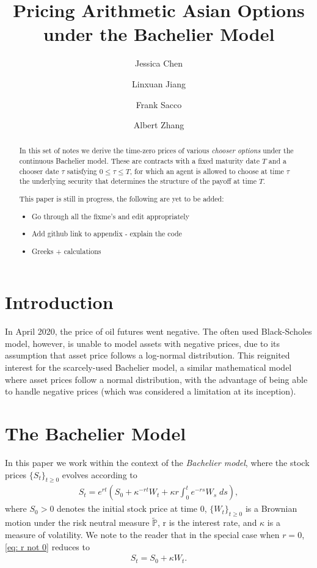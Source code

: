 \documentclass[reqno]{amsart}
\title{Pricing Arithmetic Asian Options under the Bachelier Model} %
\author{Jessica Chen}
\author{Linxuan Jiang}
\author{Frank Sacco}
\author{Albert Zhang}
\begin{document}
\begin{abstract}
     In this set of notes we derive the time-zero prices of various \emph{chooser options} under the continuous Bachelier model.
     These are contracts with a fixed maturity date $T$ and a chooser date $\tau$ satisfying $0 \le \tau \le T$, for which an agent is allowed to choose at time $\tau$ the underlying security that determines the structure of the payoff at time $T$.  

     This paper is still in progress, the following are yet to be added:
     \begin{itemize}
          \item Go through all the fixme's and edit appropriately
          \item Add github link to appendix - explain the code
          \item Greeks + calculations
     \end{itemize}
\end{abstract}


\maketitle  
\tableofcontents

\pagebreak
\section{Introduction}
In April 2020, the price of oil futures went negative.
The often used Black-Scholes model, however, is unable to model assets with negative prices, due to its assumption that asset price follows a log-normal distribution.
This reignited interest for the scarcely-used Bachelier model, a similar mathematical model where asset prices follow a normal distribution, with the advantage of being able to handle negative prices (which was considered a limitation at its inception).

\section{The Bachelier Model}
In this paper we work within the context of the \emph{Bachelier model}, where the stock prices $\{S_t\}_{t \ge 0}$ evolves according to 
\begin{align}\label{eq: r not 0}
	 S_t = e^{rt} \left( S_0 + \kappa^{-rt}W_t + \kappa r \int_0^t e^{-rs} W_s \; ds \right),
\end{align}
where $S_0 > 0$ denotes the initial stock price at time 0, $\{W_t\}_{t \ge 0}$ is a Brownian motion under the risk neutral measure $\tilde{\mathbb{P}}$, r is the interest rate, and $\kappa$ is a measure of volatility.
We note to the reader that in the special case when $r = 0$, \eqref{eq: r not 0} reduces to 
\begin{align}\label{eq: r=0}
     S_t = S_0 + \kappa W_t. 
\end{align}
\end{document}
